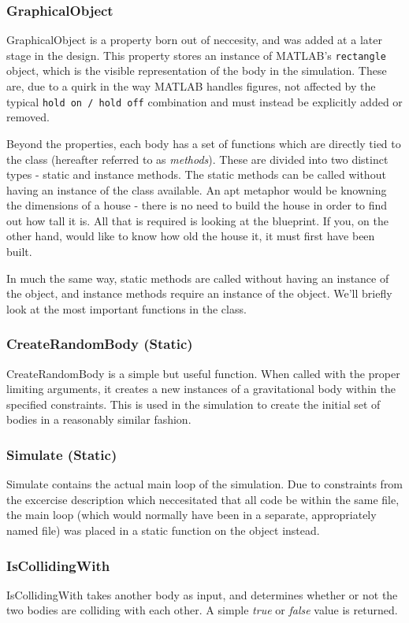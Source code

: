 \documentclass[11pt]{article}
\begin{document}
\subsubsection{GraphicalObject}
GraphicalObject is a property born out of neccesity, and was added at a later stage in the design. This property stores an instance of MATLAB's \verb|rectangle| object, which is the visible representation of the body in the simulation. These are, due to a quirk in the way MATLAB handles figures, not affected by the typical \verb|hold on / hold off| combination and must instead be explicitly added or removed.

Beyond the properties, each body has a set of functions which are directly tied to the class (hereafter referred to as \emph{methods}). These are divided into two distinct types - static and instance methods. The static methods can be called without having an instance of the class available. An apt metaphor would be knowning the dimensions of a house - there is no need to build the house in order to find out how tall it is. All that is required is looking at the blueprint. If you, on the other hand, would like to know how old the house it, it must first have been built.

In much the same way, static methods are called without having an instance of the object, and instance methods require an instance of the object. We'll briefly look at the most important functions in the class.

\subsubsection{CreateRandomBody (Static)}
CreateRandomBody is a simple but useful function. When called with the proper limiting arguments, it creates a new instances of a gravitational body within the specified constraints. This is used in the simulation to create the initial set of bodies in a reasonably similar fashion.
\subsubsection{Simulate (Static)}
Simulate contains the actual main loop of the simulation. Due to constraints from the excercise description which neccesitated that all code be within the same file, the main loop (which would normally have been in a separate, appropriately named file) was placed in a static function on the object instead.
\subsubsection{IsCollidingWith}
IsCollidingWith takes another body as input, and determines whether or not the two bodies are colliding with each other. A simple \emph{true} or \emph{false} value is returned.
\end{document}
